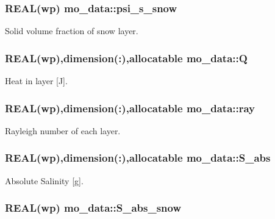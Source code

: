 \hypertarget{namespacemo__data_a05df5047190129b7388a1ad5804ef145}{
\subsubsection[{psi\_\-s\_\-snow}]{\setlength{\rightskip}{0pt plus 5cm}REAL(wp) {\bf mo\_\-data::psi\_\-s\_\-snow}}}
\label{namespacemo__data_a05df5047190129b7388a1ad5804ef145}


Solid volume fraction of snow layer. 

\hypertarget{namespacemo__data_aa221cb1abb5ab4f4d2e8ca7987aeed56}{
\subsubsection[{Q}]{\setlength{\rightskip}{0pt plus 5cm}REAL(wp),dimension(:),allocatable {\bf mo\_\-data::Q}}}
\label{namespacemo__data_aa221cb1abb5ab4f4d2e8ca7987aeed56}


Heat in layer \mbox{[}J\mbox{]}. 

\hypertarget{namespacemo__data_a3ffdac0536a998149773806217f42543}{
\subsubsection[{ray}]{\setlength{\rightskip}{0pt plus 5cm}REAL(wp),dimension(:),allocatable {\bf mo\_\-data::ray}}}
\label{namespacemo__data_a3ffdac0536a998149773806217f42543}


Rayleigh number of each layer. 

\hypertarget{namespacemo__data_a1bc8433ee56482cce780b7630ab22867}{
\subsubsection[{S\_\-abs}]{\setlength{\rightskip}{0pt plus 5cm}REAL(wp),dimension(:),allocatable {\bf mo\_\-data::S\_\-abs}}}
\label{namespacemo__data_a1bc8433ee56482cce780b7630ab22867}


Absolute Salinity \mbox{[}g\mbox{]}. 

\hypertarget{namespacemo__data_afacea50e8d2e4a7725adb27d613ca4c3}{
\subsubsection[{S\_\-abs\_\-snow}]{\setlength{\rightskip}{0pt plus 5cm}REAL(wp) {\bf mo\_\-data::S\_\-abs\_\-snow}}}
\label{namespacemo__data_afacea50e8d2e4a7725adb27d613ca4c3}



